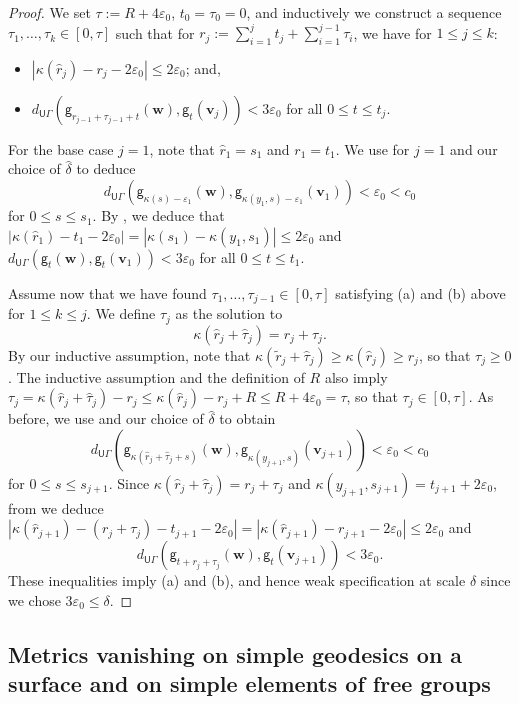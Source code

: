\documentclass[twoside]{amsart}
\theoremstyle{definition}
\numberwithin{equation}{section}
\numberwithin{theorem}{section}
\newcommand{\msf}[1]{\mathsf{#1}}
\newcommand{\G}{\Gamma}
\newcommand{\del}{\delta}
\newcommand{\ep}{\epsilon}
\renewcommand{\epsilon}{\varepsilon}
\renewcommand{\k}{\kappa}
\newcommand{\wh}{\widehat}
\newcommand{\wt}{\widetilde}
\newcommand{\vv}{\mathbf{v}}
\newcommand{\vw}{\mathbf{w}}
\newcommand{\UG}{\msf{U}\G}
\newcommand{\vg}{\msf{g}}
\begin{document}
\begin{proof}
We set $\tau:=R+4\ep_0$, $t_0=\tau_0=0$, and inductively we construct a sequence $\tau_1,\dots,\tau_k\in [0,\tau]$ such that for $r_j:=\sum_{i=1}^{j}t_j+\sum_{i=1}^{j-1}\tau_i$, we have for $1\leq j\leq k$:
\begin{itemize}
\item[(a)]$|\k(\wh{r}_{j})-r_{j}-2\ep_0|\leq 2\ep_0$; and,
    \item[(b)] $d_{\UG}(\vg_{
    r_{j-1}+\tau_{j-1}+t}
    (\vw),\vg_t(\vv_j))<3\ep_0$ for all $0\leq t\leq t_j$.
\end{itemize}

For the base case $j=1$, note that $\wh{r}_1=s_1$ and $r_1=t_1$. We use  for $j=1$ and our choice of $\hat\del$ to deduce
$$d_{\UG}(\vg_{\k(s)-\ep_1}(\vw),\vg_{\k(y_1,s)-\ep_1}(\vv_1))<\ep_0<c_0$$ for $0\leq s\leq s_1$. By , we deduce that $|\k(\wh{r}_1)-t_1-2\ep_0|=|\k(s_1)-\k(y_1,s_1)|\leq 2\ep_0$ and $d_{\UG}(\vg_t(\vw),\vg_t(\vv_1))<3\ep_0$ for all $0\leq t\leq t_1$. 

Assume now that we have found $\tau_1,\dots,\tau_{j-1}\in [0,\tau]$ satisfying (a) and (b) above for $1\leq k\leq j$. We define $\tau_j$ as the solution to 
\[\k(\wh{r}_{j}+\wh\tau_j)=r_j+\tau_j.\]
By our inductive assumption, note that $\k(\wt{r}_j+\wh{\tau}_j)\geq \k(\wh{r}_j)\geq r_j$, so that $\tau_j\geq 0$. The inductive assumption and the definition of $R$ also imply
$\tau_j=\k(\wh{r}_j+\wh\tau_j)-r_j\leq \k(\wh{r}_j)-r_j+R\leq R+4\ep_0=\tau$, so that $\tau_j\in [0,\tau]$.  As before, we use  and our choice of $\hat\del$ to obtain
$$d_{\UG}(\vg_{\k(\wh{r}_{j}+\wh\tau_{j}+s)}(\vw),\vg_{\k(y_{j+1},s)}(\vv_{j+1}))<\ep_0<c_0$$
for $0\leq s\leq s_{j+1}$. Since $\k(\wh{r}_j+\wh\tau_j)=r_j+\tau_j$ and $\k(y_{j+1},s_{j+1})=t_{j+1}+2\ep_0$, from  we deduce
$|\k(\wh{r}_{j+1})-(r_j+\tau_j)-t_{j+1}-2\ep_0|=|\k(\wh{r}_{j+1})-r_{j+1}-2\ep_0|\leq 2\ep_0$ 
and $$d_{\UG}(\vg_{t+r_j+\tau_j}(\vw),\vg_t(\vv_{j+1}))<3\ep_0.$$ These inequalities imply (a) and (b), and hence weak specification at scale $\del$ since we chose $3\ep_0\leq \del$.  
\end{proof}




\subsection{Metrics vanishing on simple geodesics on a surface and on simple elements of free groups}\label{subsec:exotic}
\end{document}
